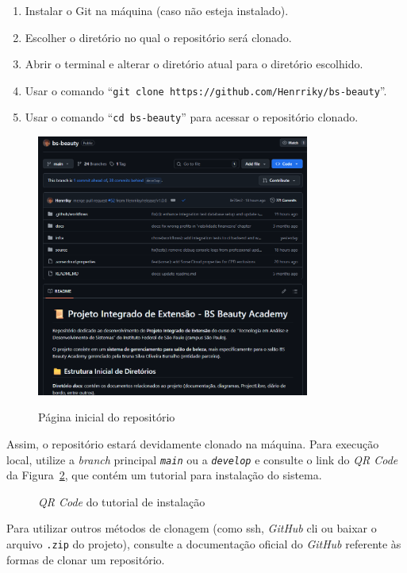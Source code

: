 \begin{enumerate}
	\item Instalar o Git na máquina (caso não esteja instalado).
	\item Escolher o diretório no qual o repositório será clonado.
	\item Abrir o terminal e alterar o diretório atual para o diretório escolhido.
	\item Usar o comando ``\texttt{git clone https://github.com/Henrriky/bs-beauty}''.
	\item Usar o comando ``\texttt{cd bs-beauty}'' para acessar o repositório clonado.
\end{enumerate}

\begin{figure}[h]
	\centering
	\caption{Página inicial do repositório}
	\includegraphics[width=0.8\textwidth]{cap03-gestao/imagens/bsbeauty-repositorio.png}
	\label{fig:inicio-repositorio}
\end{figure}

Assim, o repositório estará devidamente clonado na máquina. Para execução local, utilize a \textit{branch} principal \texttt{\textit{main}} ou a \texttt{\textit{develop}} e consulte o link do \emph{QR Code} da Figura~\ref{fig:qrcode-readme}, que contém um tutorial para instalação do sistema.

\begin{figure}[h]
	\centering
	\caption{\emph{QR Code} do tutorial de instalação}
	\label{fig:qrcode-readme}
\end{figure}

Para utilizar outros métodos de clonagem (como \gls{ssh}, \emph{GitHub} \gls{cli} ou baixar o arquivo \texttt{.zip} do projeto), consulte a documentação oficial do \emph{GitHub} \cite{clone-2025} referente às formas de clonar um repositório.